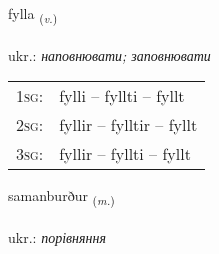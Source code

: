\documentclass[frontgrid, backgrid]{flacards}\usepackage[]{graphicx}\usepackage[]{xcolor}
\begin{document}
\renewcommand{\flhead}{\vskip5pt \fboxsep=0pt {\small\bfseries\footnotesize Sagnorð | дієслово}}
\renewcommand{\fcfoot}{\vskip5pt \fboxsep=0pt \hspace{2pt}{\small\bfseries\footnotesize 2K}}

\renewcommand{\blhead}{\vskip5pt {\small\bfseries\footnotesize Sagnorð | дієслово }}
\renewcommand{\bcfoot}{\vskip5pt \hspace{2pt}{\small\bfseries\footnotesize 2K}}


{fylla \small{\textsubscript{(\textit{v.})}} \\[1ex] %
\textphonetic{[fɪtla]} \\
ukr.: \emph{наповнювати; заповнювати} \\  [2ex]
\renewcommand*{\arraystretch}{0.8}
\begin{tabular}{p{1cm}l}
\textsc{1sg}: & fylli -- fyllti -- fyllt \\ 
\textsc{2sg}: & fyllir -- fylltir -- fyllt \\ 
\textsc{3sg}: & fyllir -- fyllti -- fyllt \\ 
\end{tabular}
}

\renewcommand{\flhead}{\vskip5pt \fboxsep=0pt {\small\bfseries\footnotesize Nafnorð | іменник}}
\renewcommand{\fcfoot}{\vskip5pt \fboxsep=0pt \hspace{2pt}{\small\bfseries\footnotesize 2K}}

\renewcommand{\blhead}{\vskip5pt {\small\bfseries\footnotesize Nafnorð | іменник }}
\renewcommand{\bcfoot}{\vskip5pt \hspace{2pt}{\small\bfseries\footnotesize 2K}}


{samanburður \small{\textsubscript{(\textit{m.})}} \\[1ex] %
\textphonetic{[saːmanpʏrðʏr]} \\
ukr.: \emph{порівняння} \\  [2ex]
\renewcommand*{\arraystretch}{0.8}
}
\end{document}
